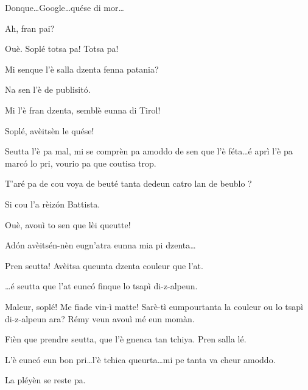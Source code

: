 \begin{drama}
\Remyspeaks{} Donque\ldots Google\ldots quése di mor\ldots

\Cesarspeaks{} Ah, fran pai?

\Remyspeaks Ouè.  Soplé totsa pa! Totsa pa!

\Hermannspeaks Mi senque l'è salla dzenta fenna patania?

\Remyspeaks Na sen l'è de publisit\'o.

\Hermannspeaks Mi l'è fran dzenta, semblè eunna di Tirol!

\Remyspeaks Soplé, avèitsèn le quése!

\Cesarspeaks Seutta l'è pa mal, mi se comprèn pa amoddo de sen que l'è féta\ldots é aprì l'è pa marc\'o lo pri, vourio pa que coutisa trop.

\Battistaspeaks{}  T’aré pa de cou voya de beuté tanta dedeun catro lan de beublo \arrabbiato?

\Hermannspeaks Si cou l’a rèiz\'on Battista.

\Battistaspeaks Ouè, avouì to sen que lèi queutte!


\Cesarspeaks Ad\'on avèitsén-nèn eugn'atra eunna mia pi dzenta\ldots


\Hermannspeaks Pren seutta! Avèitsa queunta dzenta couleur que l'at.

\Battistaspeaks \ldots é seutta que l’at eunc\'o finque lo tsapì di-z-alpeun.

\Cesarspeaks{} Maleur, soplé! Me fiade vin-ì matte! Sarè-tì eumpourtanta la couleur ou lo tsapì di-z-alpeun ara? Rémy veun avouì mé eun momàn.


\Cesarspeaks{} Fièn que prendre seutta, que l'è gnenca tan tchiya. Pren salla lé.

\Remyspeaks  L'è eunc\'o eun bon pri\ldots l'è tchica queurta\ldots mi pe tanta va cheur amoddo.

\Battistaspeaks  La pléyèn se reste pa.



\end{drama}
